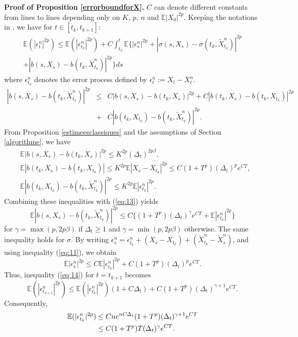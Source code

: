 \documentclass[a4paper, 11pt]{article}
\newcommand{\E}{\mathbb{E}}
\newcommand{\1}{\mathbf{1}}
\begin{document}
\noindent\textbf{Proof of Proposition \ref{errorboundforX}.}
$C$ can denote different constants from lines to lines depending only on $K$, $p$, $n$ and $\E|X_0|^{2p}$.
Keeping the notations in \cite{faure}, we have for $t\in [t_k, t_{k+1}]$:
\begin{multline}
\label{eq:14}
\E(|\epsilon_t^n|^{2p})\leq \E(|\epsilon_{t_k}^n|^{2p})+C\int_{t_k}^t \E\{ |\epsilon_s^n|^{2p}+|\sigma(s,X_s)-\sigma(t_k,\tilde{X}_{t_k}^n)|^{2p}\\
+|b(s,X_s)-b(t_k,\tilde{X}_{t_k}^n)|^{2p}\}ds
\end{multline}
where $\epsilon_{t_k}^n$ denotes the error process defined by $\epsilon_t^n:=X_t-X_t^n$.
\begin{eqnarray}
\label{eq:13}
|b(s,X_s)-b(t_k,\tilde{X}_{t_k}^n)|^{2p}&\leq& C|b(s,X_s)-b(t_k,X_s)|^{2p}+C|b(t_k,X_s)-b(t_k,X_{t_k})|^{2p}\nonumber\\
&+&C|b(t_k,X_{t_k})-b(t_k,\tilde{X}_{t_k}^n)|^{2p}.
\end{eqnarray}
From Proposition \ref{estimeesclassiques} and the assumptions of Section \ref{algorithme}, we have
\begin{align*}
&\E|b(s,X_s)-b(t_k,X_s)|^{2p}\leq K^{2p}(\Delta_t)^{2p\beta},\\
&\E|b(t_k,X_s)-b(t_k,X_{t_k})|\leq K^{2p}\E|X_s-X_{t_k}|^{2p}\leq C(1+T^p)(\Delta_t)^pe^{CT},\\
&\E|b(t_k,X_{t_k})-b(t_k,\tilde{X}_{t_k}^n)|^{2p}\leq K^{2p}\E|\epsilon_{t_k}^n|^{2p}.
\end{align*}
Combining these inequalities with (\ref{eq:13}) yields 
\begin{equation}
\label{eq:15}
\E|b(s,X_s)-b(t_k,\tilde{X}_{t_k}^n)|^{2p}\leq C\{(1+T^p)(\Delta_t)^\gamma e^{CT}+\E|\epsilon_{t_k}^n|^{2p}\}
\end{equation}
for $\gamma=\max(p,2p\beta)$ if $\Delta_t\geq1$ and $\gamma=\min(p,2p\beta)$ otherwise. The same inequality holds for $\sigma$. By writing $\epsilon_s^n=\epsilon_{t_k}^n+(X_s-X_{t_k})+(\tilde{X}_{t_k}^n-\tilde{X}_s^n)$, and using inequality (\ref{eq:11}), we obtain
$$\E|\epsilon_s^n|^{2p}\leq C\E|\epsilon_{t_k}^n|^{2p}+C(1+T^p)(\Delta_t)^pe^{CT}.$$
Thus, inequality (\ref{eq:14}) for $t=t_{k+1}$ becomes
$$\E(|\epsilon_{t_{k+1}}^n|^{2p})\leq \E(|\epsilon_{t_k}^n|^{2p})(1+C\Delta_t)+C(1+T^p)(\Delta_t)^{\gamma+1} e^{CT}.$$
Consequently,
\begin{align}
\E(|\epsilon_{t_k}^n|^{2p})&\leq Cne^{nC\Delta_t}(1+T^p)(\Delta_t)^{\gamma+1} e^{CT}\notag\\
&\leq C(1+T^p)T(\Delta_t)^\gamma e^{CT}. \label{eq:16}
\end{align}
\end{document}
